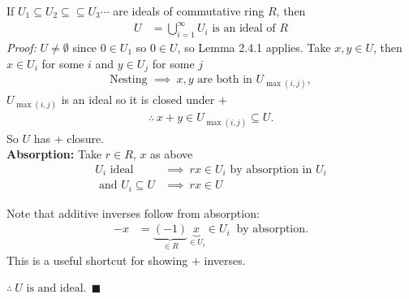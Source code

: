 \begin{lemma*}
    If $U_1 \subseteq U_2 \subseteq \subseteq U_3 \cdots$ are ideals of commutative ring $R$, then 
    \begin{align*}
        U &= \bigcup_{i=1}^\infty U_i \text{   is an ideal of }R
    \end{align*}
    \textit{Proof:} $U\neq \emptyset$ since $0\in U_1$ so $0\in U$, so Lemma 2.4.1 applies. Take $x,y\in U$, then $x\in U_i$ for some $i$ and $y\in U_j$ for some $j$
    \begin{align*}
        \text{Nesting } \implies \ x,y \text{ are both in } U_{\max(i,j)},
    \end{align*}
    $U_{\max(i,j)}$ is an ideal so it is closed under $+$
    \begin{align*}        
        \therefore \ x+y \in U_{\max(i,j)} \subseteq U.
    \end{align*}
    So $U$ has $+$ closure. \\
    \textbf{Absorption:} Take $r\in R$, $x$ as above
    \begin{align*}
        U_i \text{ ideal }& \implies \ rx \in U_i \text{ by absorption in }U_i \\
        \text{ and }U_i \subseteq U &\implies \ rx \in U 
    \end{align*}
    \begin{tcolorbox}
        Note that additive inverses follow from absorption:
        \begin{align*}
            -x &= \underbrace{(-1)}_{\in R}\underbrace{x}_{\in U_i} \in U_i \ \text{ by absorption}. 
        \end{align*}
        This is a useful shortcut for showing $+$ inverses.
    \end{tcolorbox}
    $\therefore \ U \text{ is and ideal}. \ \ \blacksquare$
\end{lemma*}

